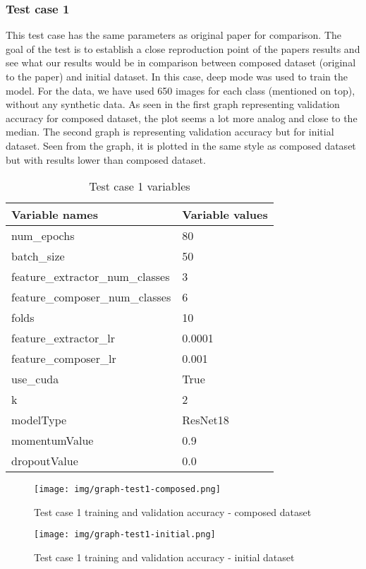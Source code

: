 \subsubsection{Test case 1}
This test case has the same parameters as original paper for comparison. The goal of the test is to establish a close reproduction point of the papers results and see what our results would be in comparison between composed dataset (original to the paper) and initial dataset. In this case, deep mode was used to train the model.
\newline
For the data, we have used 650 images for each class (mentioned on top), without any synthetic data. As seen in the first graph representing validation accuracy for composed dataset, the plot seems a lot more analog and close to the median. The second graph is representing validation accuracy but for initial dataset. Seen from the graph, it is plotted in the same style as composed dataset but with results lower than composed dataset.
\begin{table}[!ht]
  \centering
    \begin{tabular}{ |m{15em}|m{17em}| } 
     \hline
        Variable names & Variable values \\ 
     \hline
        num{\_}epochs & 80 \\ 
     \hline
        batch{\_}size & 50 \\
     \hline
        feature{\_}extractor{\_}num{\_}classes & 3 \\
     \hline
        feature{\_}composer{\_}num{\_}classes & 6 \\
     \hline
        folds & 10 \\
     \hline
        feature{\_}extractor{\_}lr & 0.0001 \\
     \hline
        feature{\_}composer{\_}lr & 0.001 \\
     \hline
        use{\_}cuda & True \\
     \hline
        k & 2 \\
     \hline
        modelType & ResNet18 \\
     \hline
        momentumValue & 0.9 \\
     \hline
        dropoutValue & 0.0 \\
     \hline
    \end{tabular}
\caption{Test case 1 variables}
\end{table}

\begin{figure}[H]
    \centerline{\texttt{[image: img/graph-test1-composed.png]}}
    \caption{Test case 1 training and validation accuracy - composed dataset}
\end{figure}
\begin{figure}[H]
    \centerline{\texttt{[image: img/graph-test1-initial.png]}}
    \caption{Test case 1 training and validation accuracy - initial dataset}
\end{figure}

